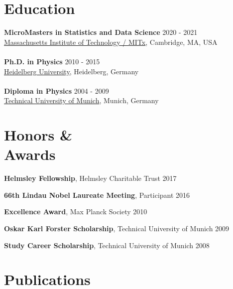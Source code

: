 \documentclass[margin,line]{res}
\begin{document}
\begin{resume}

\section{\sc Education}
{\bf MicroMasters in Statistics and Data Science} \hfill {2020 - 2021}\\
\href{https://micromasters.mit.edu/ds/}{Massachusetts Institute of Technology / MITx}, Cambridge, MA, USA\\
\vspace*{-3mm}\\
{\bf Ph.D. in Physics} \hfill {2010 - 2015}\\
\href{https://www.uni-heidelberg.de/en}{Heidelberg University}, Heidelberg, Germany\\
\vspace*{-3mm}\\
{\bf Diploma in Physics} \hfill {2004 - 2009}\\
\href{https://www.tum.de/en/}{Technical University of Munich}, Munich, Germany


\section{\sc Honors \& \\Awards} 
{\bf Helmsley Fellowship}, Helmsley Charitable Trust  \hfill 2017

\vspace*{-3mm}
{\bf 66th Lindau Nobel Laureate Meeting}, Participant \hfill {2016}

\vspace*{-3mm}
{\bf Excellence Award}, Max Planck Society \hfill 2010

\vspace*{-3mm}
{\bf Oskar Karl Forster Scholarship}, Technical University of Munich  \hfill 2009

\vspace*{-3mm}
{\bf Study Career Scholarship}, Technical University of Munich  \hfill 2008


\section{\sc Publications}

\begin{enumerate}[leftmargin=*]


\end{enumerate}
\end{resume}
\end{document}
